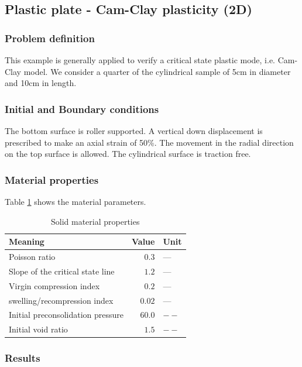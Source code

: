\subsection{Plastic plate - Cam-Clay plasticity (2D)}
\label{sec:ccup}

\subsubsection*{Problem definition}

This example is generally applied to verify a critical state plastic
mode, i.e. Cam-Clay model. We consider a quarter of the cylindrical
sample of 5cm in diameter and 10cm in length.

\subsubsection*{Initial and Boundary conditions}

The bottom surface is roller supported.
A vertical down displacement is prescribed to make an axial strain of 50\%. The movement in the radial
direction on the top surface is allowed. The cylindrical  surface is traction free.

\subsubsection*{Material properties}

Table \ref{tab:m_cc_s} shows the material parameters.
 \begin{table}[H]
\begin{tabular}{lrl}
\hline\noalign{\smallskip}
  \hline
 Meaning & Value & Unit \\
  \hline
 Poisson ratio & $0.3$ & ---\\
 Slope of the critical state line & $1.2$ & ---\\
 Virgin compression index & $0.2$ & ---\\
 swelling/recompression index & $0.02$ & ---\\
 Initial preconsolidation pressure & $60.0$ & $--$\\
 Initial void ratio & $1.5$ & $--$\\
 \hline\hline
\end{tabular}
\caption{Solid material properties} %
\label{tab:m_cc_s}
\end{table}

\subsubsection*{Results}

